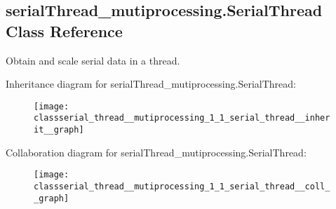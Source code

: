 \hypertarget{classserial_thread__mutiprocessing_1_1_serial_thread}{\subsection{serial\-Thread\-\_\-mutiprocessing.\-Serial\-Thread Class Reference}
\label{classserial_thread__mutiprocessing_1_1_serial_thread}
}


Obtain and scale serial data in a thread.  




Inheritance diagram for serial\-Thread\-\_\-mutiprocessing.\-Serial\-Thread\-:\nopagebreak
\begin{figure}[H]
\begin{center}
\leavevmode
\texttt{[image: classserial\_thread\_\_mutiprocessing\_1\_1\_serial\_thread\_\_inherit\_\_graph]}
\end{center}
\end{figure}


Collaboration diagram for serial\-Thread\-\_\-mutiprocessing.\-Serial\-Thread\-:\nopagebreak
\begin{figure}[H]
\begin{center}
\leavevmode
\texttt{[image: classserial\_thread\_\_mutiprocessing\_1\_1\_serial\_thread\_\_coll\_\_graph]}
\end{center}
\end{figure}
